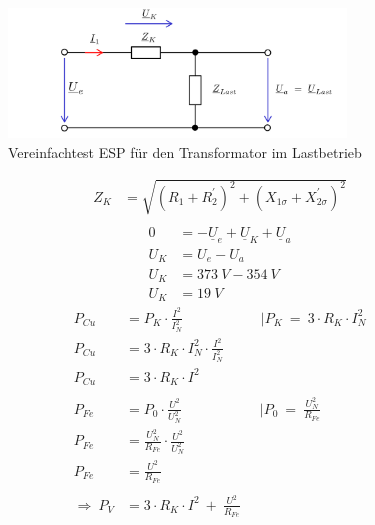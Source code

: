 \begin{enumerate}[label=\alph*)]
	      \begin{figure}[h!]
		      \begin{center}
			      \includegraphics[width=0.8\textwidth]{img/4.2.2.2}
		      \end{center}
		      \caption{Vereinfachtest ESP für den Transformator im Lastbetrieb}\label{img:4.2.2.2}
	      \end{figure}
	      \begin{align*}
		      Z_{K} & = \sqrt{(R_{1}+R^{'}_{2})^2+(X_{1\sigma}+X^{'}_{2\sigma})^2} \\
	      \end{align*}
	      \begin{align*}
		      0     & = -\underline{U}_{e}+\underline{U}_{K}+\underline{U}_{a} \\
		      U_{K} & = U_{e}-U_{a}                                            \\
		      U_{K} & = 373\ V - 354\ V                                        \\
		      U_{K} & = 19\ V
	      \end{align*}
	      \begin{align*}
		      P_{Cu}               & = P_K\cdot \frac{I^2}{I^2_N}\mspace{100mu} |P_K\ =\ 3\cdot R_K\cdot I^2_N \\
		      P_{Cu}               & = 3\cdot R_K\cdot I^2_N\cdot \frac{I^2}{I^2_N}                            \\
		      P_{Cu}               & = 3\cdot R_K\cdot I^2                                                     \\
		      \\
		      P_{Fe}               & = P_0\cdot \frac{U^2}{U^2_N}\mspace{100mu} |P_0\ =\ \frac{U^2_N}{R_{Fe}}  \\
		      P_{Fe}               & = \frac{U^2_N}{R_{Fe}}\cdot \frac{U^2}{U^2_N}                             \\
		      P_{Fe}               & = \frac{U^2}{R_{Fe}}                                                      \\
		      \\
		      \Longrightarrow\ P_V & = 3\cdot R_K\cdot I^2\ +\ \frac{U^2}{R_{Fe}}
	      \end{align*}


\end{enumerate}
